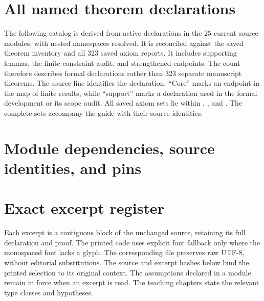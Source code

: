 
\clearpage\section{All named theorem declarations}\label{sec:catalog}
The following catalog is derived from active declarations in the 25 current source modules, with nested namespaces resolved. It is reconciled against the saved theorem inventory and all 323 saved axiom reports. It includes supporting lemmas, the finite constraint audit, and strengthened endpoints. The count therefore describes formal declarations rather than 323 separate manuscript theorems. The source line identifies the declaration. ``Core'' marks an endpoint in the map of finite results, while ``support'' marks a declaration used in the formal development or its scope audit. All saved axiom sets lie within , , and . The complete sets accompany the guide with their source identities.

\clearpage\section{Module dependencies, source identities, and pins}\label{sec:dependencies}

\clearpage\section{Exact excerpt register}\label{sec:excerpts}
Each excerpt is a contiguous block of the unchanged source, retaining its full declaration and proof. The printed code uses explicit font fallback only where the monospaced font lacks a glyph. The corresponding  file preserves raw UTF-8, without editorial substitutions. The source and excerpt hashes below bind the printed selection to its original context. The assumptions declared in a module remain in force when an excerpt is read. The teaching chapters state the relevant type classes and hypotheses.


